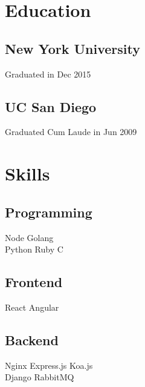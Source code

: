 \documentclass[letterpaper]{deedy-resume} %
\begin{document}
\begin{minipage}[t]{0.33\textwidth} %


\section{Education} 

\subsection{New York University}

Graduated in Dec 2015

\sectionspace %


\subsection{UC San Diego}

Graduated Cum Laude in Jun 2009

\sectionspace %


\section{Skills}
\subsection{Programming}
Node \textbullet{}
Golang \\
Python \textbullet{}
Ruby \textbullet{}  
C
\sectionspace
\subsection{Frontend}
React \textbullet{}
Angular
\sectionspace
\subsection{Backend}
Nginx \textbullet{}
Express.js \textbullet{}
Koa.js \\
Django \textbullet
RabbitMQ
\sectionspace

\end{minipage}
\end{document}
